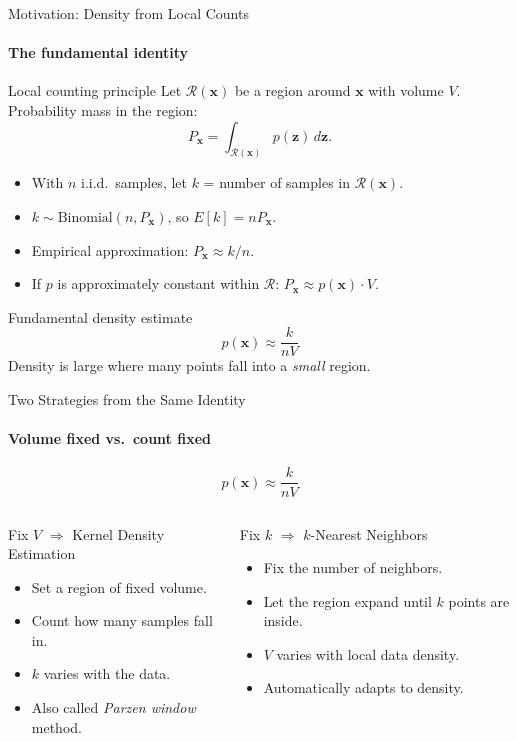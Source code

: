 \begin{frame}{Motivation: Density from Local Counts}
  \framesubtitle{The fundamental identity}
  \begin{block}{Local counting principle}
    Let $\mathcal{R}(\mathbf{x})$ be a region around $\mathbf{x}$ with volume $V$.\\
    Probability mass in the region:
    \[
      P_\mathbf{x} = \int_{\mathcal{R}(\mathbf{x})} p(\mathbf{z})\,d\mathbf{z}.
    \]
  \end{block}
  \begin{itemize}
    \item With $n$ i.i.d.\ samples, let $k$ = number of samples in $\mathcal{R}(\mathbf{x})$.
    \item $k \sim \text{Binomial}(n, P_\mathbf{x})$, so $E[k] = nP_\mathbf{x}$.
    \item Empirical approximation: $P_\mathbf{x} \approx k/n$.
    \item If $p$ is approximately constant within $\mathcal{R}$: $P_\mathbf{x}\approx p(\mathbf{x})\cdot V$.
  \end{itemize}
  \begin{alertblock}{Fundamental density estimate}
    \[
      p(\mathbf{x}) \approx \frac{k}{nV}
    \]
    Density is large where many points fall into a \emph{small} region.
  \end{alertblock}
\end{frame}

\begin{frame}{Two Strategies from the Same Identity}
  \framesubtitle{Volume fixed vs.\ count fixed}
  \[
    p(\mathbf{x}) \approx \frac{k}{nV}
  \]
  \bigskip
  \begin{columns}[T]
      \begin{block}{Fix $V$ $\Rightarrow$ Kernel Density Estimation}
        \begin{itemize}
          \item Set a region of fixed volume.
          \item Count how many samples fall in.
          \item $k$ varies with the data.
          \item Also called \emph{Parzen window} method.
        \end{itemize}
      \end{block}
      \begin{block}{Fix $k$ $\Rightarrow$ $k$-Nearest Neighbors}
        \begin{itemize}
          \item Fix the number of neighbors.
          \item Let the region expand until $k$ points are inside.
          \item $V$ varies with local data density.
          \item Automatically adapts to density.
        \end{itemize}
      \end{block}
  \end{columns}
\end{frame}

